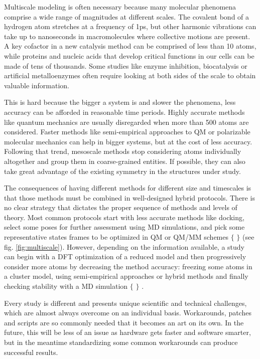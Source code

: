 Multiscale modeling is often necessary because many molecular phenomena comprise a wide range of magnitudes at different scales. The covalent bond of a hydrogen atom stretches at a frequency of 1ps, but other harmonic vibrations can take up to nanoseconds in macromolecules where collective motions are present. A key cofactor in a new catalysis method can be comprised of less than 10 atoms, while proteins and nucleic acids that develop critical functions in our cells can be made of tens of thousands. Some studies like enzyme inhibition, biocatalysis or artificial metalloenzymes often require looking at both sides of the scale to obtain valuable information.

This is hard because the bigger a system is and slower the phenomena, less accuracy can be afforded in reasonable time periods. Highly accurate methods like quantum mechanics are usually disregarded when more than 500 atoms are considered. Faster methods like semi-empirical approaches to QM or polarizable molecular mechanics can help in bigger systems, but at the cost of less accuracy. Following that trend, mesoscale methods stop considering atoms individually altogether and group them in coarse-grained entities. If possible, they can also take great advantage of the existing symmetry in the structures under study.

The consequences of having different methods for different size and timescales is that those methods must be combined in well-designed hybrid protocols. There is no clear strategy that dictates the proper sequence of methods and levels of theory. Most common protocols start with less accurate methods like docking, select some poses for further assessment using MD simulations, and pick some representative states frames to be optimized in QM or QM/MM schemes $ \{ $ $ \} $  (see fig. \ref{fig:multiscale}). However, depending on the information available, a study can begin with a DFT optimization of a reduced model and then progressively consider more atoms by decreasing the method accuracy: freezing some atoms in a cluster model, using semi-empirical approaches or hybrid methods and finally checking stability with a MD simulation $ \{ $ $ \} $ .

Every study is different and presents unique scientific and technical challenges, which are almost always overcome on an individual basis. Workarounds, patches and scripts are so commonly needed that it becomes an art on its own. In the future, this will be less of an issue as hardware gets faster and software smarter, but in the meantime standardizing some common workarounds can produce successful results.



